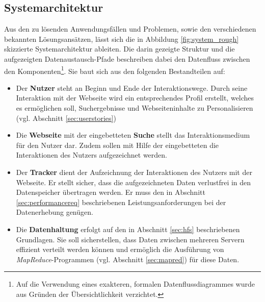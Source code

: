 \subsection{Systemarchitektur}\label{sec:system_rough}

Aus den zu lösenden Anwendungsfällen und Problemen, sowie den verschiedenen bekannten Lösungsansätzen, lässt sich die in Abbildung \ref{fig:system_rough} skizzierte Systemarchitektur ableiten. Die darin gezeigte Struktur und die aufgezeigten Datenaustausch-Pfade beschreiben dabei den Datenfluss zwischen den Komponenten\footnote{Auf die Verwendung eines exakteren, formalen Datenflussdiagrammes wurde aus Gründen der Übersichtlichkeit verzichtet.}. Sie baut sich aus den folgenden Bestandteilen auf:

\begin{itemize}
\item Der \textbf{Nutzer} steht an Beginn und Ende der Interaktionswege. Durch seine Interaktion mit der Webseite wird ein entsprechendes Profil erstellt, welches es ermöglichen soll, Suchergebnisse und Webseiteninhalte  zu Personalisieren (vgl. Abschnitt \ref{sec:userstories})
\item Die \textbf{Webseite} mit der eingebetteten \textbf{Suche} stellt das Interaktionsmedium für den Nutzer dar. Zudem sollen mit Hilfe der eingebetteten  die Interaktionen des Nutzers aufgezeichnet werden.
\item Der \textbf{Tracker} dient der Aufzeichnung der Interaktionen des Nutzers mit der Webseite. Er stellt sicher, dass die aufgezeichneten Daten verlustfrei in den Datenspeicher übertragen werden. Er muss den in Abschnitt \ref{sec:performancereq} beschriebenen Leistungsanforderungen bei der Datenerhebung genügen.
\item Die \textbf{Datenhaltung} erfolgt auf den in Abschnitt \ref{sec:hfs} beschriebenen Grundlagen. Sie soll sicherstellen, dass Daten zwischen mehreren  Servern effizient verteilt werden können und ermöglich die Ausführung von \textit{MapReduce}-Programmen (vgl. Abschnitt \ref{sec:mapred}) für diese Daten.


\end{itemize}
